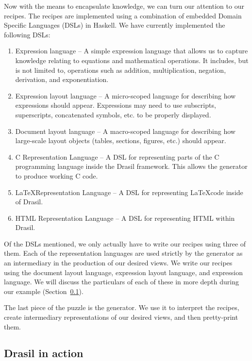 \documentclass[preprint, 10pt]{sigplanconf}
\begin{document}
Now with the means to encapsulate knowledge, we can turn our attention to our
recipes. The recipes are implemented using a combination of embedded Domain
Specific Languages (DSLs) in Haskell. We have currently implemented the
following DSLs:

\begin{enumerate}
\item Expression language -- A simple expression language that allows us to
capture knowledge relating to equations and mathematical operations. It
includes, but is not limited to, operations such as addition, multiplication,
negation, derivation, and exponentiation.

\item Expression layout language -- A micro-scoped language for describing how
expressions should appear. Expressions may need to use subscripts, superscripts,
concatenated symbols, etc. to be properly displayed.

\item Document layout language -- A macro-scoped language for describing how
large-scale layout objects (tables, sections, figures, etc.) should appear.

\item C Representation Language -- A DSL for representing parts of the C
programming language inside the Drasil framework. This allows the generator to
produce working C code.

\item \LaTeX Representation Language -- A DSL for representing \LaTeX code
inside of Drasil.

\item HTML Representation Language -- A DSL for representing HTML within Drasil.
\end{enumerate}

Of the DSLs mentioned, we only actually have to write our recipes using three of
them. Each of the representation languages are used strictly by the generator as
an intermediary in the production of our desired views. We write our recipes
using the document layout language, expression layout language, and expression
language. We will discuss the particulars of each of these in more depth during
our example (Section~\ref{subsec:example}).

The last piece of the puzzle is the generator. We use it to interpret the
recipes, create intermediary representations of our desired views, and then
pretty-print them.

\subsection{Drasil in action} 
\label{subsec:example}
\end{document}
